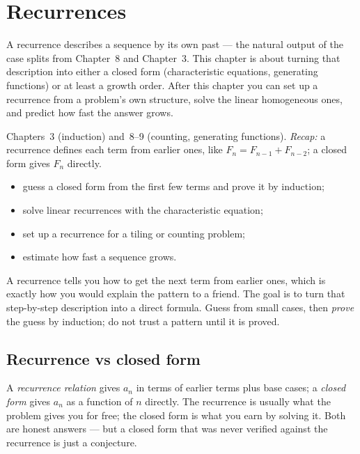 \chapter{Recurrences}\label{ch:rec}

A recurrence describes a sequence by its own past --- the natural output
of the case splits from Chapter~8 and Chapter~3. This chapter is about
turning that description into either a closed form (characteristic
equations, generating functions) or at least a growth order. After this
chapter you can set up a recurrence from a problem's own structure,
solve the linear homogeneous ones, and predict how fast the answer
grows.

\begin{rulebox}
Chapters~3 (induction) and~8--9 (counting, generating functions). \emph{Recap:} a recurrence defines each term from earlier ones, like $F_n=F_{n-1}+F_{n-2}$; a closed form gives $F_n$ directly.
\end{rulebox}
\begin{wins}
\begin{itemize}
\item guess a closed form from the first few terms and prove it by induction;
\item solve linear recurrences with the characteristic equation;
\item set up a recurrence for a tiling or counting problem;
\item estimate how fast a sequence grows.
\end{itemize}
\end{wins}
\begin{principle}
A recurrence tells you how to get the next term from earlier ones, which is exactly how you would explain the pattern to a friend. The goal is to turn that step-by-step description into a direct formula. Guess from small cases, then \emph{prove} the guess by induction; do not trust a pattern until it is proved.
\end{principle}

\section{Recurrence vs closed form}\label{sec:recvs}
A \emph{recurrence relation} gives $a_n$ in terms of earlier terms plus
base cases; a \emph{closed form} gives $a_n$ as a function of $n$
directly. The recurrence is usually what the problem gives you for
free; the closed form is what you earn by solving it. Both are honest
answers --- but a closed form that was never verified against the
recurrence is just a conjecture.

